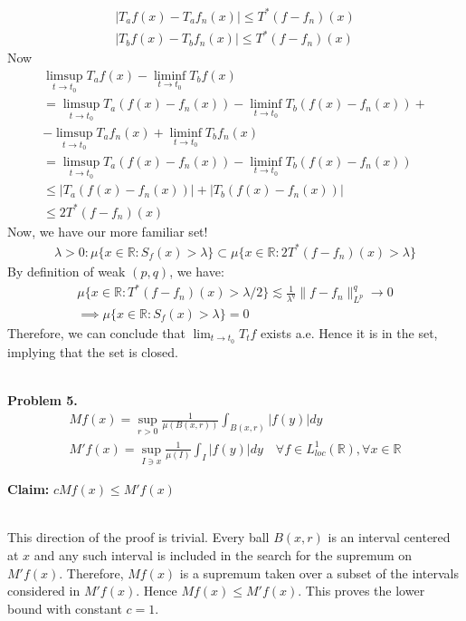 \documentclass{article}
\newcommand{\R}{\mathbb{R}}
\begin{document}
\begin{gather*}
    |T_af(x) - T_af_n(x)| \leq T^* (f-f_n)(x)\\
    |T_bf(x) - T_bf_n(x)| \leq T^* (f-f_n)(x)
\end{gather*}
Now
\begin{gather*}
    \limsup_{t\to t_0} T_{a}f(x) - \liminf_{t \to t_0} T_{b}f(x) \\
    = \limsup_{t\to t_0} T_{a}(f(x) - f_n(x)) - \liminf_{t \to t_0} T_{b}(f(x) - f_n(x)) +\\ - \limsup_{t\to t_0} T_{a}f_n(x) + \liminf_{t \to t_0} T_{b}f_n(x)\\
    = \limsup_{t\to t_0} T_{a}(f(x) - f_n(x)) - \liminf_{t \to t_0} T_{b}(f(x) - f_n(x)) \\
    \leq |T_{a}(f(x) - f_n(x))| + |T_{b}(f(x) - f_n(x))| \\
    \leq 2 T^* (f-f_n)(x)
\end{gather*}
Now, we have our more familiar set!
\begin{gather*}
    \lambda > 0 : \mu\{x\in \R: S_f(x) > \lambda\} \subset \mu\{x\in \R: 2 T^* (f-f_n)(x) > \lambda\}
\end{gather*}
By definition of weak $(p,q)$, we have:
\begin{gather*}
    \mu\{x\in \R: T^* (f-f_n)(x) > \lambda/2\} \lesssim \frac{1}{\lambda^q} \lVert f - f_n\rVert_{L^p}^q \to 0\\
    \implies \mu\{x\in \R: S_f(x) > \lambda\} = 0
\end{gather*}
Therefore, we can conclude that $\lim_{t\to t_0} T_t f$ exists a.e. Hence it is in the set, implying that the set is closed.
\\~



\textbf{Problem 5. } 
\begin{gather*}
    Mf(x) = \sup_{r > 0} \frac{1}{\mu(B(x,r))} \int_{B(x,r)} |f(y)|dy\\
    M'f(x) = \sup_{I \ni x} \frac{1}{\mu(I)} \int_{I} |f(y)|dy \quad \forall f \in L_{loc}^1(\R), \forall x \in \R
\end{gather*}

\textbf{Claim: } $cMf(x) \leq M'f(x)$
\\~

This direction of the proof is trivial. Every ball $B(x,r)$ is an interval centered at $x$ and any such interval is included in the search for the supremum on $M'f(x)$. Therefore, $Mf(x)$ is a supremum taken over a subset of the intervals considered in $M'f(x)$. Hence $Mf(x) \leq M'f(x)$. This proves the lower bound with constant $c=1$.
\\~
\end{document}
